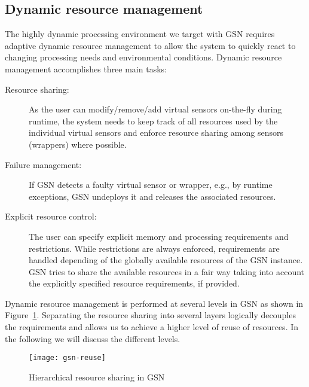 
\subsection{Dynamic resource management}
\label{sec:dynam-reso-manag}

The highly dynamic processing environment we target with GSN requires adaptive
dynamic resource management to allow the system to quickly react to changing
processing needs and environmental conditions. Dynamic resource management
accomplishes three main tasks:

\begin{description}
\item[Resource sharing:] As the user can modify/remove/add virtual sensors
  on-the-fly during runtime, the system needs to keep track of all resources
  used by the individual virtual sensors and enforce resource sharing among
  sensors (wrappers) where possible.
\item[Failure management:] If GSN detects a faulty virtual sensor or wrapper,
    e.g., by runtime exceptions, GSN undeploys it and releases the associated
    resources. 
  \item[Explicit resource control:] The user can specify explicit memory and
    processing requirements and restrictions. While restrictions are always
    enforced, requirements are handled depending of the globally available
    resources of the GSN instance. GSN tries to share the available resources
    in a fair way taking into account the explicitly specified resource
    requirements, if provided.
\end{description}

Dynamic resource management is performed at several levels in GSN as
shown in Figure~\ref{fig:resource-layers}. Separating the resource
sharing into several layers logically decouples the requirements and
allows us to achieve a higher level of reuse of resources. In the
following we will discuss the different levels.

\begin{figure}%
  \centering
  \texttt{[image: gsn-reuse]}
  \caption{Hierarchical resource sharing in GSN}
  \label{fig:resource-layers}
\end{figure}

